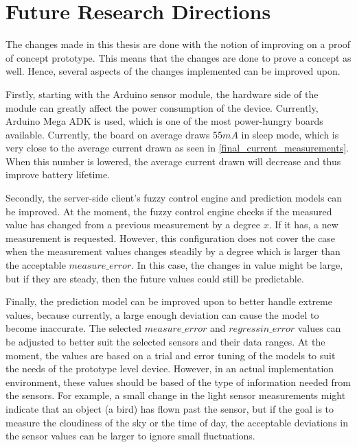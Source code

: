 

\chapter{Future Research Directions} %

The changes made in this thesis are done with the notion of improving on a proof of concept prototype. This means that the changes are done to prove a concept as well. 
Hence, several aspects of the changes implemented can be improved upon.

Firstly, starting with the Arduino sensor module, the hardware side of the module can greatly affect the power consumption of the device. Currently, Arduino Mega ADK is used, which is one of the most power-hungry boards available. Currently, the board on average draws 55$mA$ in sleep mode, which is very close to the average current drawn as seen in \autoref{final_current_measurements}. When this number is lowered, the average current drawn will decrease and thus improve battery lifetime. 

Secondly, the server-side client's fuzzy control engine and prediction models can be improved. At the moment, the fuzzy control engine checks if the measured value has changed from a previous measurement by a degree $x$. If it has, a new measurement is requested. However, this configuration does not cover the case when the measurement values changes steadily by a degree which is larger than the acceptable $measure\_error$. In this case, the changes in value might be large, but if they are steady, then the future values could still be predictable. 

Finally, the prediction model can be improved upon to better handle extreme values, because currently, a large enough deviation can cause the model to become inaccurate. The selected $measure\_error$ and $regressin\_error$ values can be adjusted to better suit the selected sensors and their data ranges. At the moment, the values are based on a trial and error tuning of the models to suit the needs of the prototype level device. However, in an actual implementation environment, these values should be based of the type of information needed from the sensors. For example, a small change in the light sensor measurements might indicate that an object (a bird) has flown past the sensor, but if the goal is to measure the cloudiness of the sky or the time of day, the acceptable deviations in the sensor values can be larger to ignore small fluctuations.  

















